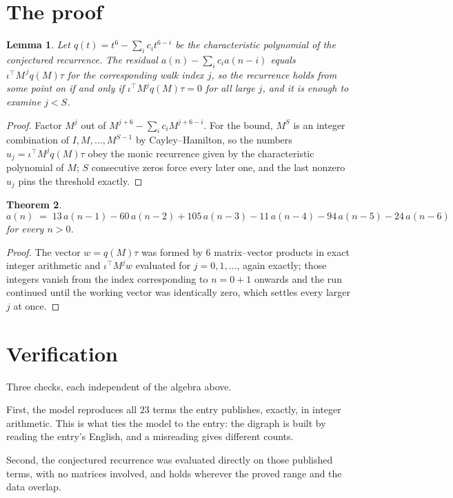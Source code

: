 \documentclass[11pt,a4paper]{article}
\theoremstyle{plain}
\newtheorem{theorem}{Theorem}
\newtheorem{lemma}[theorem]{Lemma}
\theoremstyle{definition}
\begin{document}
\section{The proof}

\begin{lemma}\label{lem:crit}
Let $q(t)=t^{6}-\sum_i c_it^{6-i}$ be the characteristic polynomial of the
conjectured recurrence. The residual $a(n)-\sum_ic_ia(n-i)$ equals
$\iota^{\!\top}M^{\,j}q(M)\tau$ for the corresponding walk index $j$, so the recurrence
holds from some point on if and only if $\iota^{\!\top}M^{j}q(M)\tau=0$ for all large $j$,
and it is enough to examine $j<S$.
\end{lemma}

\begin{proof}
Factor $M^{j}$ out of $M^{j+6}-\sum_ic_iM^{j+6-i}$. For the bound, $M^{S}$
is an integer combination of $I,M,\dots,M^{S-1}$ by Cayley--Hamilton, so the numbers
$u_j=\iota^{\!\top}M^{j}q(M)\tau$ obey the monic recurrence given by the characteristic
polynomial of $M$; $S$ consecutive zeros force every later one, and the last nonzero $u_j$
pins the threshold exactly.
\end{proof}

\begin{theorem}
\[
a(n)\;=\;13\,a(n-1) - 60\,a(n-2) + 105\,a(n-3) - 11\,a(n-4) - 94\,a(n-5) - 24\,a(n-6)
\]
for every $n>0$.
\end{theorem}

\begin{proof}
The vector $w=q(M)\tau$ was formed by $6$ matrix--vector products in exact integer
arithmetic and $\iota^{\!\top}M^{j}w$ evaluated for $j=0,1,\dots$, again exactly; those
integers vanish from the index corresponding to $n=0+1$ onwards and the run continued
until the working vector was identically zero, which settles every larger $j$ at once.
\end{proof}

\section{Verification}

Three checks, each independent of the algebra above.

First, the model reproduces all $23$ terms the entry publishes, exactly, in integer
arithmetic. This is what ties the model to the entry: the digraph is built by reading the
entry's English, and a misreading gives different counts.

Second, the conjectured recurrence was evaluated directly on those published terms, with no
matrices involved, and holds wherever the proved range and the data overlap.
\end{document}
